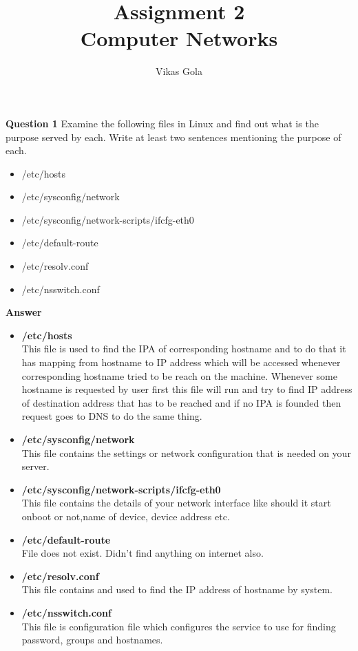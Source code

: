 \documentclass[14pt]{extarticle}
\begin{document}
    \pagestyle{plain}

    \title{\Huge Assignment 2\\ Computer Networks}
    \author{\huge Vikas Gola}
    \maketitle
    \newpage

    \noindent
    \textbf{\large Question 1}
    Examine the following files in Linux and find out what is the purpose served by each. 
    Write at least two sentences mentioning the purpose of each.
    \begin{itemize}
        \item /etc/hosts
        \item /etc/sysconfig/network
        \item /etc/sysconfig/network-scripts/ifcfg-eth0
        \item /etc/default-route
        \item /etc/resolv.conf
        \item /etc/nsswitch.conf
    \end{itemize}
    \textbf{\large Answer}
    \begin{itemize}
        \item \textbf{/etc/hosts}
        \\This file is used to find the IPA of corresponding hostname and to do that 
        it has mapping from hostname to IP address which will be accessed whenever corresponding hostname tried to be reach
        on the machine. Whenever some hostname is requested by user first this file will run and try to find IP address
        of destination address that has to be reached and if no IPA is founded then request goes to DNS to do the same thing.
        \item \textbf{/etc/sysconfig/network}
        \\This file contains the settings or network configuration that is needed on your server.  
        \item \textbf{/etc/sysconfig/network-scripts/ifcfg-eth0}
        \\This file contains the details of your network interface like should it start onboot or not,name of device, device address etc.   
        \item \textbf{/etc/default-route}
        \\ File does not exist. Didn't find anything on internet also.
        \item \textbf{/etc/resolv.conf}
        \\This file contains and used to find the IP address of hostname by system. 
        \item \textbf{/etc/nsswitch.conf}
        \\This file is configuration file which configures the service to use for finding password, groups and hostnames.
    \end{itemize}
    \vspace{1cm}
\end{document}
